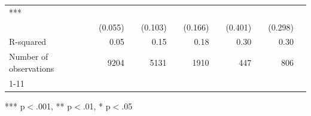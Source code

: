 \documentclass{article}
\begin{document}
\begin{table}[!h]
\begin{tabular}{lllllllllll}
  \multicolumn{1}{l}{***} \\
\multicolumn{1}{l}{} &
  \multicolumn{1}{r}{(0.055)} &
  \multicolumn{1}{l}{} &
  \multicolumn{1}{r}{(0.103)} &
  \multicolumn{1}{l}{} &
  \multicolumn{1}{r}{(0.166)} &
  \multicolumn{1}{l}{} &
  \multicolumn{1}{r}{(0.401)} &
  \multicolumn{1}{l}{} &
  \multicolumn{1}{r}{(0.298)} &
  \multicolumn{1}{l}{} \\
\multicolumn{1}{l}{R-squared} &
  \multicolumn{1}{r}{0.05} &
  \multicolumn{1}{l}{} &
  \multicolumn{1}{r}{0.15} &
  \multicolumn{1}{l}{} &
  \multicolumn{1}{r}{0.18} &
  \multicolumn{1}{l}{} &
  \multicolumn{1}{r}{0.30} &
  \multicolumn{1}{l}{} &
  \multicolumn{1}{r}{0.30} &
  \multicolumn{1}{l}{} \\
\multicolumn{1}{l}{Number of observations} &
  \multicolumn{1}{r}{9204} &
  \multicolumn{1}{l}{} &
  \multicolumn{1}{r}{5131} &
  \multicolumn{1}{l}{} &
  \multicolumn{1}{r}{1910} &
  \multicolumn{1}{l}{} &
  \multicolumn{1}{r}{447} &
  \multicolumn{1}{l}{} &
  \multicolumn{1}{r}{806} &
  \multicolumn{1}{l}{} \\
\cline{1-11}
\end{tabular}

\footnotesize{
*** p$<$.001, ** p$<$.01, * p$<$.05
}
\end{table}
\end{document}
